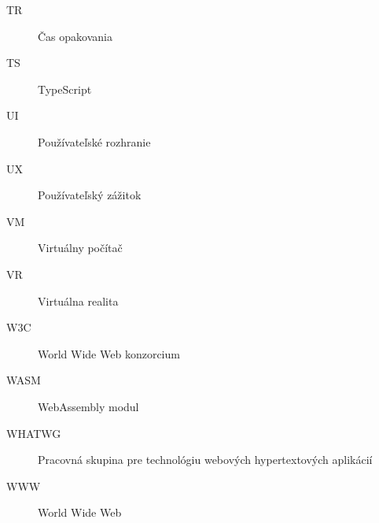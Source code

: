 \begin{description}
	\item[TR] Čas opakovania
	\item[TS] TypeScript
	\item[UI] Používateľské rozhranie
	\item[UX] Používateľský zážitok
	\item[VM] Virtuálny počítač
	\item[VR] Virtuálna realita
	\item[W3C] World Wide Web konzorcium
	\item[WASM] WebAssembly modul
	\item[WHATWG] Pracovná skupina pre technológiu webových hypertextových aplikácií
	\item[WWW] World Wide Web
\end{description}


